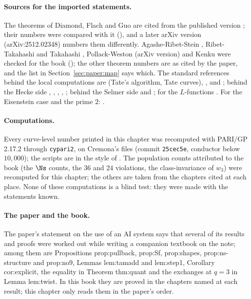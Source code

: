 \begin{sloppypar}
\paragraph{Sources for the imported statements.} The theorems of Diamond, Flach and Guo are cited from the published version \cite{DFG04}; their numbers were compared with it (),
and a later arXiv version (arXiv:2512.02348) numbers them differently. Agashe-Ribet-Stein \cite{ARS12}, Ribet-Takahashi \cite{RibetTakahashi97} and Takahashi \cite{Takahashi01}, Pollack-Weston
\cite{PollackWeston11} (arXiv version) and Kenku \cite{Kenku} were checked for the book (); the other theorem numbers are as cited by the paper, and the list in
Section~\ref{sec:paper:map} says which. The standard references behind the local computations are \cite{SilvermanATAEC} (Tate's algorithm, Tate curves), \cite{SerreTate68}, \cite{Kraus90} and \cite{Tate75};
behind the Hecke side \cite{DDT}, \cite{AtkinLehner70}, \cite{AtkinLi78}, \cite{Ribet83}, \cite{AU96}; behind the Selmer side \cite{FPR94} and \cite{BlochKato}; for the $L$-functions \cite{Shimura75,Shimura76,Rankin39}.
For the Eisenstein case and the prime $2$: \cite{Mazur77,Watkins02,CalegariEmerton09}.

\paragraph{Computations.} Every curve-level number printed in this chapter was recomputed with PARI/GP \cite{PARI} 2.17.2 through \texttt{cypari2}, on Cremona's files \cite{ecdata} (commit \texttt{25cec5e},
conductor below $10{,}000$); the scripts are in the style of . The population counts attributed to the book (the $\Ns$ counts, the $36$ and $24$ violations, the class-invariance
of $w_3$) were recomputed for this chapter; the others are taken from the chapters cited at each place. None of these computations is a blind test: they were made with the statements known.

\paragraph{The paper and the book.} The paper's statement on the use of an AI system says that several of its results and proofs were worked out while writing a companion textbook on the
note; among them are Propositions prop:pullback, prop:Sf, prop:shapes, prop:ns-structure and prop:no9, Lemmas lem:tamadd and lem:step1, Corollary cor:explicit, the equality in Theorem
thm:quant and the exchanges at $q=3$ in Lemma lem:twist. In this book they are proved in the chapters named at each result; this chapter only reads them in the paper's order.
\end{sloppypar}
